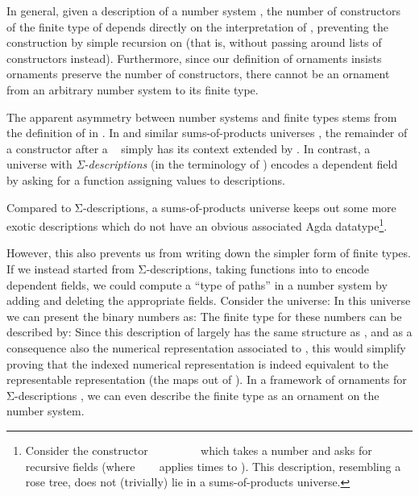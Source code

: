 In general, given a description of a number system , the number of constructors of the finite type  of  depends directly on the interpretation of , preventing the construction  by simple recursion on  (that is, without passing around lists of constructors instead). Furthermore, since our definition of ornaments insists ornaments preserve the number of constructors, there cannot be an ornament from an arbitrary number system to its finite type. 

The apparent asymmetry between number systems and finite types stems from the definition of  in . In  and similar sums-of-products universes \cite{practgen,sijsling}, the remainder of a constructor  after a \  simply has its context extended by . In contrast, a universe with \emph{Σ-descriptions} \cite{effectfully,progorn,algorn} (in the terminology of \cite{sijsling}) encodes a dependent field  by asking for a function  assigning values  to descriptions.

Compared to Σ-descriptions, a sums-of-products universe keeps out some more exotic descriptions which do not have an obvious associated Agda datatype\footnote{Consider the constructor \ \bN{}\ \ \ \ \ \ \  which takes a number  and asks for  recursive fields (where \ \ \  applies   times to ). This description, resembling a rose tree, does not (trivially) lie in a sums-of-products universe.}.

However, this also prevents us from writing down the simpler form of finite types. If we instead started from Σ-descriptions, taking functions into  to encode dependent fields, we could compute a ``type of paths'' in a number system by adding and deleting the appropriate fields. Consider the universe:
In this universe we can present the binary numbers as:
The finite type for these numbers can be described by:
Since this description of  largely has the same structure as , and as a consequence also the numerical representation associated to , this would simplify proving that the indexed numerical representation is indeed equivalent to the representable representation (the maps out of ). In a framework of ornaments for Σ-descriptions \cite{progorn,algorn}, we can even describe the finite type as an ornament on the number system.



